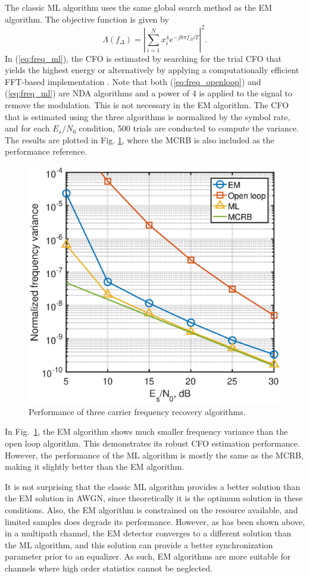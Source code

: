 \documentclass[journal,comsoc,onecolumn, 12pt,draftclsnofoot]{IEEEtran}
\begin{document}
The classic ML algorithm uses the same global search method as the EM algorithm.
The objective function is given by 
\begin{equation}
\Lambda (f_\Delta)=\left| \sum\limits_{i = 1}^N {{{ {{x^4_i}e^{-j8\pi f_\Delta i T}}}}} \right|^2. 
\label{eq:freq_ml}
\end{equation}
In (\ref{eq:freq_ml}), the CFO is estimated by searching for the trial CFO that yields the highest energy or alternatively by applying a computationally efficient FFT-based implementation \cite{Wang2004}.
Note that both (\ref{eq:freq_openloop}) and (\ref{eq:freq_ml}) are NDA algorithms and a power of 4 is applied to the signal to remove the modulation.
This is not necessary in the EM algorithm.
The CFO that is estimated using the three algorithms is normalized by the symbol rate,
and for each \(E_s/N_0\) condition, 500 trials are conducted to compute the variance.
The results are plotted in Fig. \ref{fig:per_freq}, where the MCRB is also included as the performance reference.

\begin{figure}[ht]
\centering
\includegraphics[width=3 in]{pic/per_freq.eps}
\caption{Performance of three carrier frequency recovery algorithms.}
\label{fig:per_freq} 
\end{figure} 


In Fig.~\ref{fig:per_freq}, the EM algorithm shows much smaller frequency variance than the open loop algorithm. 
This demonstrates its robust CFO estimation performance.
However, the performance of the ML algorithm is mostly the same as the MCRB, making it slightly better than the EM algorithm.

It is not surprising that the classic ML algorithm provides a better solution than the EM solution in AWGN, since theoretically it is the optimum solution in these conditions. Also, the EM algorithm is constrained on the resource available, and limited samples does degrade its performance. However, as has been shown above, in a multipath channel, the EM detector converges to a different solution than the ML algorithm, and this solution can provide a better synchronization parameter prior to an equalizer. As such, EM algorithms are more suitable for channels where high order statistics cannot be neglected.  
\end{document}
